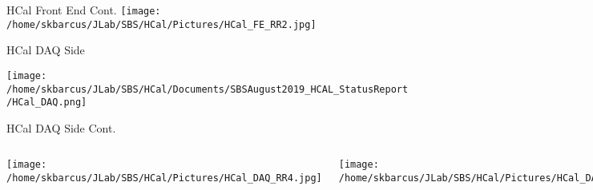 \documentclass[10pt]{beamer}
\begin{document}
\begin{frame}{HCal Front End Cont.}
    \centering
	\texttt{[image: /home/skbarcus/JLab/SBS/HCal/Pictures/HCal\_FE\_RR2.jpg]}

\end{frame}

\begin{frame}{HCal DAQ Side}

	\texttt{[image: /home/skbarcus/JLab/SBS/HCal/Documents/SBSAugust2019\_HCAL\_StatusReport/HCal\_DAQ.png]}

\end{frame}

\begin{frame}{HCal DAQ Side Cont.}

    \begin{columns}[T,onlytextwidth]
	\texttt{[image: /home/skbarcus/JLab/SBS/HCal/Pictures/HCal\_DAQ\_RR4.jpg]}
	
	\texttt{[image: /home/skbarcus/JLab/SBS/HCal/Pictures/HCal\_DAQ\_RR5.jpg]}
	\end{columns}

\end{frame}

%
%
\end{document}
